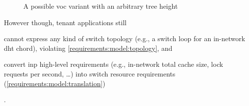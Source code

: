 \begin{figure}[!htb]
    \centering
    \usebox{\vocmodfigure}
    \caption{A possible \gls{voc} variant with an arbitrary tree height}
    \label{fig:vocmod}
\end{figure}

However though, tenant applications still
\begin{mylist}
    \item cannot express any kind of switch topology (e.g., a switch loop for an in-network \gls{dht} chord), violating \xmark \ref{requirements:model:topology}, and
    \item convert \gls{inp} high-level requirements (e.g., in-network total cache size, lock requests per second, …) into switch resource requirements (\xmark \ref{requirements:model:translation})
\end{mylist}.